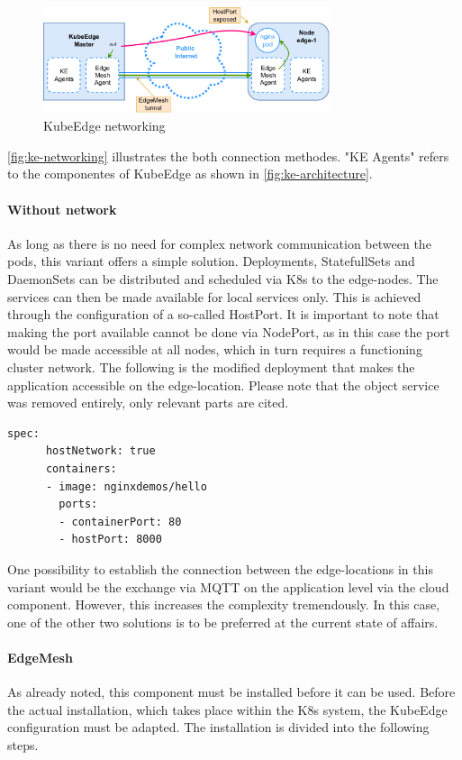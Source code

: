 \documentclass[MIC,Master,english]{twbook}%
\begin{document}
\begin{figure}[ht]
    \centering
    \includegraphics[width=0.75\textwidth]{PICs/drawio/ke-network.drawio.pdf}
    \caption{KubeEdge networking}
    \label{fig:ke-networking}
\end{figure}

\autoref{fig:ke-networking} illustrates the both connection methodes. "KE Agents" refers to the componentes of KubeEdge as shown in \autoref{fig:ke-architecture}.

\paragraph{Without network} As long as there is no need for complex network communication between the pods, this variant offers a simple solution. Deployments, StatefullSets and DaemonSets can be distributed and scheduled via \ac{K8s} to the edge-nodes. The services can then be made available for local services only. This is achieved through the configuration of a so-called HostPort. It is important to note that making the port available cannot be done via NodePort, as in this case the port would be made accessible at all nodes, which in turn requires a functioning cluster network. The following is the modified deployment that makes the application accessible on the edge-location. Please note that the object service was removed entirely, only relevant parts are cited.
\begin{lstlisting}[caption={Web-application HostPort },captionpos=b]
    spec:
      hostNetwork: true
      containers:
      - image: nginxdemos/hello
        ports:
        - containerPort: 80
        - hostPort: 8000
\end{lstlisting}

One possibility to establish the connection between the edge-locations in this variant would be the exchange via MQTT on the application level via the cloud component. However, this increases the complexity tremendously. In this case, one of the other two solutions is to be preferred at the current state of affairs.

\paragraph{EdgeMesh} As already noted, this component must be installed before it can be used. Before the actual installation, which takes place within the \ac{K8s} system, the KubeEdge configuration must be adapted. The installation is divided into the following steps.
\end{document}

